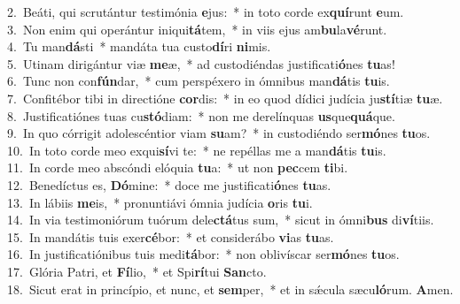 {2.~}Beáti, qui scrutántur testimónia \textbf{e}jus:~* in toto corde ex\textbf{quí}runt \textbf{e}um.\\
{3.~}Non enim qui operántur iniqui\textbf{tá}tem,~* in viis ejus am\textbf{bu}la\textbf{vé}runt.\\
{4.~}Tu man\textbf{dá}sti~* mandáta tua custo\textbf{dí}ri \textbf{ni}mis.\\
{5.~}Utinam dirigántur viæ \textbf{me}æ,~* ad custodiéndas justificati\textbf{ó}nes \textbf{tu}as!\\
{6.~}Tunc non con\textbf{fún}dar,~* cum perspéxero in ómnibus man\textbf{dá}tis \textbf{tu}is.\\
{7.~}Confitébor tibi in directióne \textbf{cor}dis:~* in eo quod dídici judícia ju\textbf{stí}tiæ \textbf{tu}æ.\\
{8.~}Justificatiónes tuas cu\textbf{stó}diam:~* non me derelínquas \textbf{us}que\textbf{quá}que.\\
{9.~}In quo córrigit adolescéntior viam \textbf{su}am?~* in custodiéndo ser\textbf{mó}nes \textbf{tu}os.\\
{10.~}In toto corde meo exqui\textbf{sí}vi te:~* ne repéllas me a man\textbf{dá}tis \textbf{tu}is.\\
{11.~}In corde meo abscóndi elóquia \textbf{tu}a:~* ut non \textbf{pec}cem \textbf{ti}bi.\\
{12.~}Benedíctus es, \textbf{Dó}mine:~* doce me justificati\textbf{ó}nes \textbf{tu}as.\\
{13.~}In lábiis \textbf{me}is,~* pronuntiávi ómnia judícia \textbf{o}ris \textbf{tu}i.\\
{14.~}In via testimoniórum tuórum dele\textbf{ctá}tus sum,~* sicut in ómni\textbf{bus} di\textbf{ví}tiis.\\
{15.~}In mandátis tuis exer\textbf{cé}bor:~* et considerábo \textbf{vi}as \textbf{tu}as.\\
{16.~}In justificatiónibus tuis medi\textbf{tá}bor:~* non oblivíscar ser\textbf{mó}nes \textbf{tu}os.\\
{17.~}Glória Patri, et \textbf{Fí}lio,~* et Spi\textbf{rí}tui \textbf{San}cto.\\
{18.~}Sicut erat in princípio, et nunc, et \textbf{sem}per,~* et in sǽcula sæcu\textbf{ló}rum. \textbf{A}men.\\
